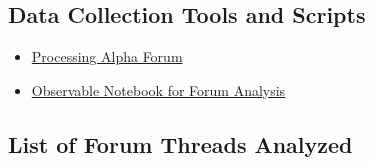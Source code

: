 \documentclass{article}
\begin{document}

\subsection{Data Collection Tools and Scripts}

\begin{itemize}
    \item \href{https://forum.processing.org/alpha/}{Processing Alpha Forum}
    \item \href{https://observablehq.com/d/042b1cf42ea9bb5e}{Observable Notebook for Forum Analysis}
\end{itemize}


\subsection{List of Forum Threads Analyzed}
\end{document}

